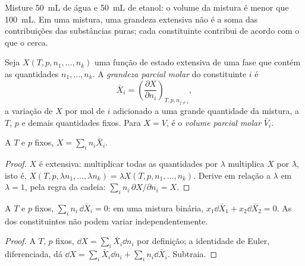 Misture \qty{50}{mL} de água e \qty{50}{mL} de etanol: o volume da mistura
é menor que \qty{100}{mL}. Em uma mistura, uma grandeza extensiva não é a
soma das contribuições das substâncias puras; cada constituinte contribui
de acordo com o que o cerca.

\begin{definition}\label{def:b2:chemical-potential:partial-molar}
Seja $X(T, p, n_1, \dots, n_k)$ uma função de estado extensiva de uma fase
que contém as quantidades $n_1, \dots, n_k$. A \emph{grandeza parcial
molar} do constituinte $i$ é
\[
  \bar X_i = \left(\frac{\partial X}{\partial n_i}\right)_{T, p, n_{j \ne i}} ,
\]
a variação de $X$ por mol de $i$ adicionado a uma grande quantidade da
mistura, a $T$, $p$ e demais quantidades fixos. Para $X = V$, é o \emph{volume
parcial molar} $\bar V_i$.
\end{definition}

\begin{theorem}\label{thm:b2:chemical-potential:euler}
A $T$ e $p$ fixos, $X = \sum_i n_i\bar X_i$.
\end{theorem}

\begin{proof}
$X$ é extensiva: multiplicar todas as quantidades por $\lambda$ multiplica $X$ por
$\lambda$, isto é, $X(T, p, \lambda n_1, \dots, \lambda n_k) = \lambda X(T, p, n_1,
\dots, n_k)$. Derive em relação a $\lambda$ em $\lambda = 1$, pela
regra da cadeia: $\sum_i n_i\,\partial X/\partial n_i = X$.
\end{proof}

\begin{proposition}\label{prop:b2:chemical-potential:gibbs-duhem}
A $T$ e $p$ fixos, $\sum_i n_i\,\dd\bar X_i = 0$: em uma mistura binária,
$x_1\dd\bar X_1 + x_2\dd\bar X_2 = 0$. As  dos
constituintes não podem variar independentemente.
\end{proposition}

\begin{proof}
A $T$, $p$ fixos, $\dd X = \sum_i\bar X_i\dd n_i$ por definição; a identidade
de Euler, diferenciada, dá $\dd X = \sum_i\bar X_i\dd n_i + \sum_i
n_i\dd\bar X_i$. Subtraia.
\end{proof}

